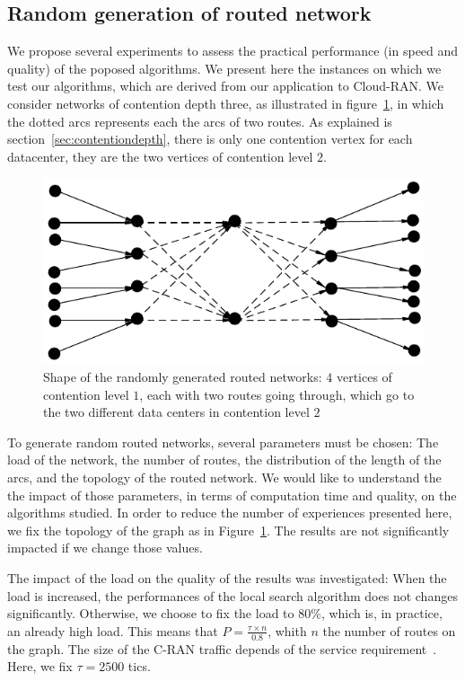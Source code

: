 \documentclass[english]{article}
\begin{document}
\subsection{Random generation of routed network}

We propose several experiments to assess the practical performance (in speed and quality) of the poposed algorithms. We present here the instances on which we test our algorithms, which are derived from our application to Cloud-RAN. We consider networks of contention depth three, as illustrated in figure~\ref{fig:randomnetworks}, in which the dotted arcs represents each the arcs of two routes. As explained is section~\ref{sec:contentiondepth}, there is only one contention vertex for each datacenter, they are the two vertices of contention level $2$.
   \begin{figure} 
	\centering
	\includegraphics[scale=0.8]{networksrandom}

\caption{Shape of the randomly generated routed networks: $4$ vertices of contention level $1$, each with two routes going through, which go to the two different data centers in contention level $2$}
\label{fig:randomnetworks}
\end{figure}

To generate random routed networks, several parameters must be chosen: The load of the network, the number of routes, the distribution of the length of the arcs, and the topology of the routed network. We would like to understand the the impact of those parameters, in terms of computation time and quality, on the algorithms studied. In order to reduce the number of experiences presented here, we fix the topology of the graph as in Figure~\ref{fig:randomnetworks}. The results are not significantly impacted if we change those values. 

 
 The impact of the load on the quality of the results was investigated: When the load is increased, the performances of the local search algorithm does not changes significantly. Otherwise, we choose to fix the load to $80\%$, which is, in practice, an already high load. This means that $P = \frac{\tau \times n}{0.8}$, whith $n$ the number of routes on the graph. The size of the C-RAN traffic depends of the service requirement~\cite{mobile2011c}. Here, we fix $\tau = 2500$ tics.
  
\end{document}
